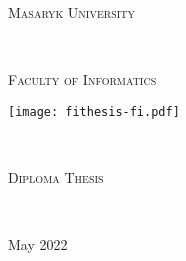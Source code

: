 \begin{titlepage}
  \vspace*{2cm}
  \makeatletter
  \begin{center}
      \begin{LARGE}
          \textsc{Masaryk University}
      \end{LARGE}\\[0.01cm]
      \begin{Large}
          \textsc{Faculty of Informatics\\}
      \end{Large}
      \vspace*{1cm}
      \texttt{[image: fithesis-fi.pdf]}\\
      \vspace*{3cm}
    \begin{Huge}
      \@title
    \end{Huge}\\[1.5cm]
    \begin{Large}
        \textsc{Diploma Thesis}
    \end{Large}\\[1.5cm]
    \begin{LARGE}
        \@author
    \end{LARGE}
    \vfill
  \end{center}
  \begin{flushright}
      \begin{large}
        May 2022
      \end{large}
  \end{flushright}
  \makeatother
\end{titlepage}

\newpage
\null
\thispagestyle{empty}
\newpage

